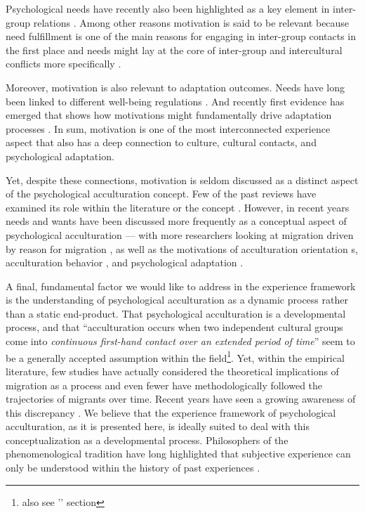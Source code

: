 \documentclass[nobib]{tufte-handout}
\begin{document}
Psychological needs have recently also been highlighted as a key element in inter-group relations \citep{Dovidio2017}. Among other reasons motivation is said to be relevant because need fulfillment is one of the main reasons for engaging in inter-group contacts in the first place \citep{Kitayama2007} and needs might lay at the core of inter-group and intercultural conflicts more specifically \citep{Hassler2021, Shnabel2008a}.

Moreover, motivation is also relevant to adaptation outcomes. Needs have long been linked to different well-being regulations \citep[e.g.,][]{Steverink2006}. And recently first evidence has emerged that shows how motivations might fundamentally drive adaptation processes \citep{Dignath2020}. 
In sum, motivation is one of the most interconnected experience aspect that also has a deep connection to culture, cultural contacts, and psychological adaptation.

Yet, despite these connections, motivation is seldom discussed as a distinct aspect of the psychological acculturation concept. Few of the past reviews have examined its role within the literature or the concept \citep[including, ][]{Ward2001a, Ward2019}. However, in recent years needs and wants have been discussed more frequently as a conceptual aspect of psychological acculturation --- with more researchers looking at migration driven by reason for migration \citep{Sandu2018}, as well as the motivations of acculturation orientation s\citep{Recker2017a}, acculturation behavior \citep{Reece2000}, and psychological adaptation \citep{Safdar2003}. 

A final, fundamental factor we would like to address in the experience framework is the understanding of psychological acculturation as a dynamic process rather than a static end-product. That psychological acculturation is a developmental process, and that ``acculturation occurs when two independent cultural groups come into \textit{continuous first-hand contact over an extended period of time}'' \citep[][186]{Berry1989} seem to be a generally accepted assumption within the field\footnote{also see '' section}. Yet, within the empirical literature, few studies have actually considered the theoretical implications of migration as a process and even fewer have methodologically followed the trajectories of migrants over time. Recent years have seen a growing awareness of this discrepancy \citep[e.g.,][]{Brown2011, Ward2019}. We believe that the experience framework of psychological acculturation, as it is presented here, is ideally suited to deal with this conceptualization as a developmental process. Philosophers of the phenomenological tradition have long highlighted that subjective experience can only be understood within the history of past experiences \citep[e.g.,][]{Heidegger1867}. 
\end{document}
